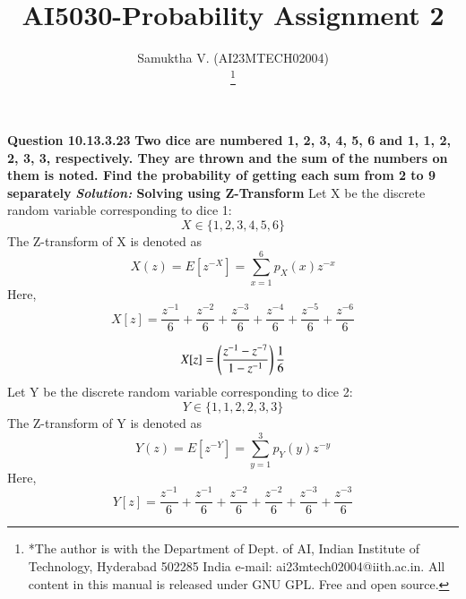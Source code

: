\documentclass[journal,12pt,twocolumn]{IEEEtran}
\begin{document}
\vspace{3cm}

\title{
AI5030-Probability Assignment 2
}
\author{ Samuktha V. (AI23MTECH02004)

	\thanks{*The author is with the Department
		of Dept. of AI, Indian Institute of Technology, Hyderabad
		502285 India e-mail:  ai23mtech02004@iith.ac.in. All content in this manual is released under GNU GPL.  Free and open source.}
}

\maketitle

\newpage


\textbf{Question 10.13.3.23 }
\newline
\textbf{Two dice are numbered 1, 2, 3, 4, 5, 6 and 1, 1, 2, 2, 3, 3, respectively. They are
thrown and the sum of the numbers on them is noted. Find the probability of getting
each sum from 2 to 9 separately }
\newline
\newline
\textbf{\emph{Solution:} Solving using Z-Transform}
\newline
\newline
{ Let X be the discrete random variable corresponding to dice 1: \[ X \in \{1,2,3,4,5,6\} \]}
The Z-transform of X is denoted as \[X(z)=E[z^{-X}]=\sum_{x=1}^{6} p_X(x) z^{-x}\]
Here,
\[X[z] = \frac{z^{-1}}{6} + \frac{z^{-2}}{6} + \frac{z^{-3}}{6} + \frac{z^{-4}}{6} + \frac{z^{-5}}{6} + \frac{z^{-6}}{6}  \]

\begin{equation}
\boldmath{X[z]=\left(\frac{z^{-1}-z^{-7}}{1-z^{-1}}\right)\frac{1}{6} }
\end{equation}
\newline
{ Let Y be the discrete random variable corresponding to dice 2: \[ Y \in \{1,1,2,2,3,3\} \]}
The Z-transform of Y is denoted as \[Y(z)=E[z^{-Y}]=\sum_{y=1}^{3} p_Y(y) z^{-y}\]
\newline
Here,
\[Y[z] = \frac{z^{-1}}{6} + \frac{z^{-1}}{6} + \frac{z^{-2}}{6} + \frac{z^{-2}}{6} + \frac{z^{-3}}{6} + \frac{z^{-3}}{6}  \]
\end{document}
